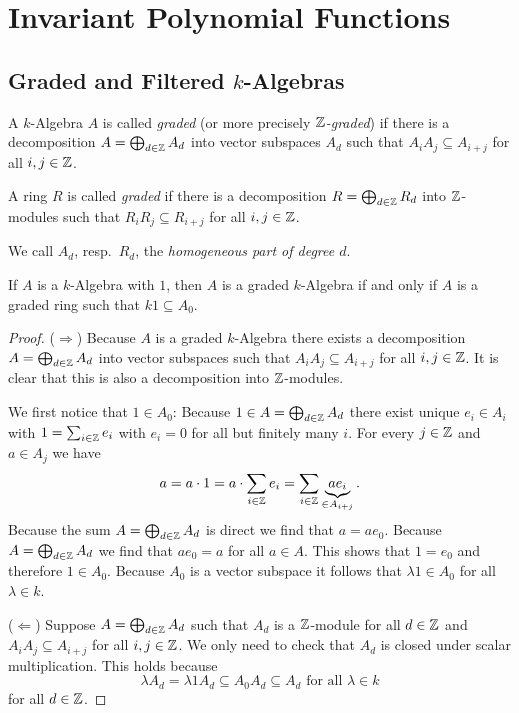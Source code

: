 \chapter{Invariant Polynomial Functions}





\section{Graded and Filtered \texorpdfstring{$k$}{k}-Algebras}


\begin{definition}
  A $k$-Algebra $A$ is called \emph{graded} (or more precisely \emph{$\mathbb{Z}$-graded}) if there is a decomposition $A = \bigoplus_{d \in \mathbb{Z}} A_d$ into vector subspaces $A_d$ such that $A_i A_j \subseteq A_{i+j}$ for all $i,j \in \mathbb{Z}$.
  
  A ring $R$ is called \emph{graded} if there is a decomposition $R = \bigoplus_{d \in \mathbb{Z}} R_d$ into $\mathbb{Z}$-modules such that $R_i R_j \subseteq R_{i+j}$ for all $i,j \in \mathbb{Z}$.
  
  We call $A_d$, resp.\ $R_d$, the \emph{homogeneous part of degree $d$}.
\end{definition}

\begin{remark}
  If $A$ is a $k$-Algebra with $1$, then $A$ is a graded $k$-Algebra if and only if $A$ is a graded ring such that $k1 \subseteq A_0$.
\end{remark}
\begin{proof}
  ($\Rightarrow$)
  Because $A$ is a graded $k$-Algebra there exists a decomposition $A = \bigoplus_{d \in \mathbb{Z}} A_d$ into vector subspaces such that $A_i A_j \subseteq A_{i+j}$ for all $i,j \in \mathbb{Z}$.
  It is clear that this is also a decomposition into $\mathbb{Z}$-modules.
  
  We first notice that $1 \in A_0$:
  Because $1 \in A = \bigoplus_{d \in \mathbb{Z}} A_d$ there exist unique $e_i \in A_i$ with $1 = \sum_{i \in \mathbb{Z}} e_i$ with $e_i = 0$ for all but finitely many $i$.
  For every $j \in \mathbb{Z}$ and $a \in A_j$ we have
  \[
      a
    = a \cdot 1
    = a \cdot \sum_{i \in \mathbb{Z}} e_i
    = \sum_{i \in \mathbb{Z}} \underbrace{a e_i}_{\in A_{i+j}}.
  \]
  Because the sum $A = \bigoplus_{d \in \mathbb{Z}} A_d$ is direct we find that $a = a e_0$.
  Because $A = \bigoplus_{d \in \mathbb{Z}} A_d$ we find that $a e_0 = a$ for all $a \in A$.
  This shows that $1 = e_0$ and therefore $1 \in A_0$.
  Because $A_0$ is a vector subspace it follows that $\lambda 1 \in A_0$ for all $\lambda \in k$.
  
  ($\Leftarrow$)
  Suppose $A = \bigoplus_{d \in \mathbb{Z}} A_d$ such that $A_d$ is a $\mathbb{Z}$-module for all $d \in \mathbb{Z}$ and $A_i A_j \subseteq A_{i+j}$ for all $i,j \in \mathbb{Z}$.
  We only need to check that $A_d$ is closed under scalar multiplication.
  This holds because
  \[
              \lambda A_d
    =         \lambda 1 A_d
    \subseteq A_0 A_d
    \subseteq A_d
    \text{ for all }
    \lambda \in k
  \]
  for all $d \in \mathbb{Z}$.
\end{proof}


